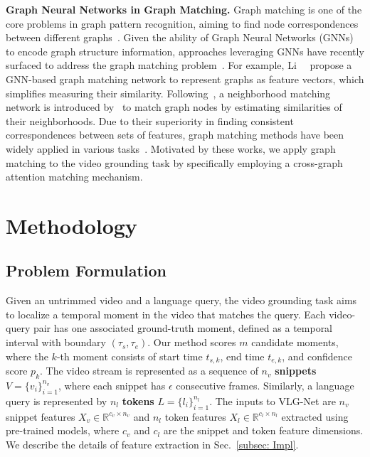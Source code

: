 \documentclass[10pt,twocolumn,letterpaper]{article}
\begin{document}
\noindent \textbf{Graph Neural Networks in Graph Matching.} 
Graph matching is one of the core problems in graph pattern recognition, aiming to find node correspondences between different graphs~\cite{caetano2009learning}. Given the ability of Graph Neural Networks (GNNs) to encode graph structure information, approaches leveraging GNNs have recently surfaced to address the graph matching problem~\cite{wang2019learning, xu2019cross}. For example, Li~\etal~\cite{li2019graph} propose a GNN-based graph matching network to represent graphs as feature vectors, which simplifies measuring their similarity. Following~\cite{li2019graph}, a neighborhood matching network is introduced by~\cite{wu2020neighborhood} to match graph nodes by estimating similarities of their neighborhoods. Due to their superiority in finding consistent correspondences between sets of features, graph matching methods have been widely applied in various tasks~\cite{jing2020visual, liu2020learning, wang2020cross, wu2020neighborhood, xu2019cross}.
Motivated by these works, we apply graph matching to the video grounding task by specifically employing a cross-graph attention matching mechanism.  
 

\section{Methodology}\label{sec: method}
\subsection{Problem Formulation}
Given an untrimmed video and a language query, the video grounding task aims to localize a temporal moment in the video that matches the query. Each video-query pair has one associated ground-truth moment, defined as a temporal interval with boundary $(\tau_s, \tau_e)$. Our method scores $m$ candidate moments, where the $k$-th moment consists of start time $t_{s,k}$, end time $t_{e,k}$, and confidence score $p_k$. 
The video stream is represented as a sequence of $n_v$ \textbf{snippets} $V=\{v_i\}_{i=1}^{n_v}$, where each snippet has $\epsilon$ consecutive frames. Similarly, a language query is represented by $n_l$ \textbf{tokens} $L=\{l_i\}_{i=1}^{n_l}$. 
The inputs to VLG-Net are $n_v$ snippet features $X_v\in \mathbb{R}^{c_v\times n_v}$ and $n_l$ token features $X_l \in \mathbb{R}^{c_l\times n_l}$ extracted using pre-trained models, where $c_v$ and $c_l$ are the snippet and token feature dimensions. We describe the details of feature extraction in Sec.~\ref{subsec: Impl}.
\end{document}
